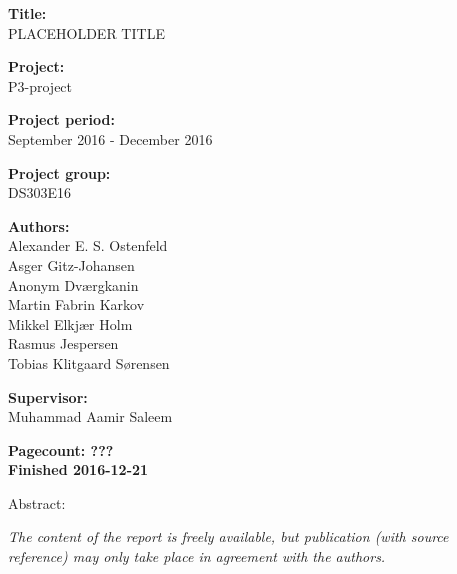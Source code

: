 \begin{minipage}[t]{0.48\textwidth}
\textbf{Title:} \\[5pt]\bigskip\hspace{2ex}
PLACEHOLDER TITLE

\textbf{Project:} \\[5pt]\bigskip\hspace{2ex}
P3-project

\textbf{Project period:} \\[5pt]\bigskip\hspace{2ex}
September 2016 - December 2016

\textbf{Project group:} \\[5pt]\bigskip\hspace{2ex}
DS303E16

\textbf{Authors:} \\[5pt]\hspace*{2ex}
Alexander E. S. Ostenfeld \\\hspace*{2ex}
Asger Gitz-Johansen \\\hspace*{2ex}
Anonym Dværgkanin \\\hspace*{2ex}
Martin Fabrin Karkov \\\hspace*{2ex}
Mikkel Elkjær Holm \\\hspace*{2ex}
Rasmus Jespersen \\\bigskip\hspace*{2ex}
Tobias Klitgaard Sørensen

\textbf{Supervisor:} \\[5pt]\hspace*{2ex}
Muhammad Aamir Saleem

\vspace*{1cm}

\textbf{Pagecount: ???} \\
\textbf{Finished 2016-12-21}

\end{minipage}
\hfill
\begin{minipage}[t]{0.483\textwidth}
Abstract: \\[5pt]
\fbox{\parbox{7cm}{\bigskip\bigskip}}
\end{minipage}

\vfill

{\footnotesize\itshape The content of the report is freely available, but publication (with source reference) may only take place in agreement with the authors.}

